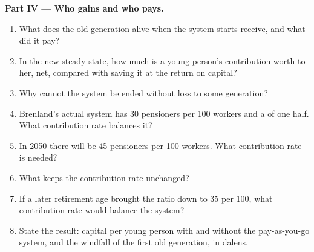 \begin{problem}
\medskip
\noindent\textbf{Part IV --- Who gains and who pays.}
\begin{enumerate}[resume]
  \item What does the old generation alive when the system starts receive, and what did it pay?
  \item In the new steady state, how much is a young person's contribution worth to her, net, compared with saving it at the return on
    capital?
  \item Why cannot the system be ended without loss to some generation?
  \item Brenland's actual system has 30 pensioners per 100 workers and a  of one half. What contribution rate balances
    it?
  \item In 2050 there will be 45 pensioners per 100 workers. What contribution rate is needed?
  \item What  keeps the contribution rate unchanged?
  \item If a later retirement age brought the ratio down to 35 per 100, what contribution rate would balance the system?
  \item State the result: capital per young person with and without the pay-as-you-go system, and the windfall of the first
    old generation, in dalens.
\end{enumerate}
\end{problem}
